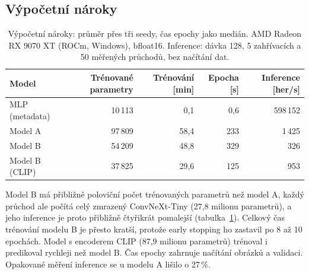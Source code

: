 \subsection*{Výpočetní nároky}

\begin{table}[h]
    \centering
    \begin{tabular}{lrrrr}
        \toprule
        Model & Trénované parametry & Trénování [min] & Epocha [s] & Inference [her/s] \\
        \midrule
        MLP (metadata) & 10\,113 & 0,1 & 0,6 & 598\,152 \\
        Model A & 97\,809 & 58,4 & 233 & 1\,425 \\
        Model B & 54\,209 & 48,8 & 329 & 326 \\
        Model B (CLIP) & 37\,825 & 29,6 & 125 & 953 \\
        \bottomrule
    \end{tabular}
    \caption{Výpočetní nároky: průměr přes tři seedy, čas epochy jako medián.
    AMD Radeon RX 9070 XT (ROCm, Windows), bfloat16. Inference: dávka 128, 5 zahřívacích
    a 50 měřených průchodů, bez načítání dat.}
    \label{tab:naroky}
\end{table}

Model B má přibližně poloviční počet trénovaných parametrů než model A, každý průchod ale
počítá celý zmrazený ConvNeXt-Tiny (27,8 milionu parametrů), a jeho inference je proto přibližně
čtyřikrát pomalejší (tabulka~\ref{tab:naroky}). Celkový čas trénování modelu B je přesto kratší,
protože early stopping ho zastavil po 8 až 10 epochách. Model s encoderem CLIP
(87,9 milionu parametrů) trénoval i predikoval rychleji než model B. Čas epochy zahrnuje
načítání obrázků a validaci. Opakované měření inference se u modelu A lišilo o 27\,\%.
